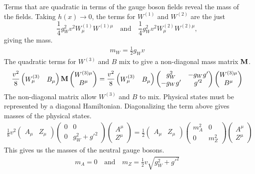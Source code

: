 Terms that are quadratic in terms of the gauge boson fields reveal the mass of the fields.
Taking $h(x) \rightarrow 0$, the terms for $W^{(1)}$ and $W^{(2)}$ are the just
\[
\frac14 g_W^2 v^2 W^{(1)}_\mu W^{(1)\mu} \quad \mathrm{and} \quad
\frac14 g_W^2 v^2 W^{(2)}_\mu W^{(2)\mu},
\]
giving the mass.
\begin{gather}
  m_W = \frac12 g_W v
\end{gather}
The quadratic terms for $W^{(3)}$ and $B$ mix to give a non-diagonal mass matrix ${\bf M}$.
\begin{gather}
  \frac{v^2}{8}
  \left(
  \begin{matrix}
  W^{(3)}_\mu & B_\mu
  \end{matrix}
  \right) {\bf M} \left(
  \begin{matrix}
  W^{(3)\mu} \\ B^\mu
  \end{matrix}
  \right) = 
  \frac{v^2}{8}
  \left(
  \begin{matrix}
  W^{(3)}_\mu & B_\mu
  \end{matrix}
  \right)
  \left(
  \begin{matrix}
    g_W^2 & -g_W g' \\
    -g_W g' & g'^2
  \end{matrix}
  \right)
  \left(
  \begin{matrix}
  W^{(3)\mu} \\ B^\mu
  \end{matrix}
  \right)
\end{gather}
The non-diagonal matrix allow $W^{(3)}$ and $B$ to mix.
Physical states must be represented by a diagonal Hamiltonian.
Diagonalizing the term above gives masses of the physical states.
\begin{gather}
  \frac18 v^2
  \left(
  \begin{matrix}
  A_\mu & Z_\mu
  \end{matrix}
  \right)
  \left(
  \begin{matrix}
    0 & 0 \\
    0 & g^2_W + g'^2
  \end{matrix}
  \right)
  \left(
  \begin{matrix}
  A^\mu \\ Z^\mu
  \end{matrix}
  \right) = 
  \frac12
  \left(
  \begin{matrix}
  A_\mu & Z_\mu
  \end{matrix}
  \right)
  \left(
  \begin{matrix}
    m_A^2 & 0 \\
    0 & m_Z^2
  \end{matrix}
  \right)
  \left(
  \begin{matrix}
  A^\mu \\ Z^\mu
  \end{matrix}
  \right)
\end{gather}
This gives us the masses of the neutral gauge bosons.
\begin{gather}
  m_A = 0 \quad \mathrm{and} \quad m_Z = \frac12 v \sqrt{g^2_W + g'^2}
\end{gather}

